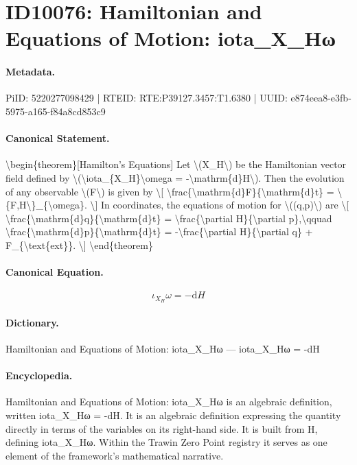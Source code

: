 \section*{ID10076: Hamiltonian and Equations of Motion: iota\_X\_Hω}
\paragraph{Metadata.}
PiID: 5220277098429 | RTEID: RTE:P39127.3457:T1.6380 | UUID: e874eea8-e3fb-5975-a165-f84a8cd853c9

\paragraph{Canonical Statement.}
\textbackslash{}begin\{theorem\}[Hamilton’s Equations] Let \textbackslash{}(X\_H\textbackslash{}) be the Hamiltonian vector field defined by \textbackslash{}(\textbackslash{}iota\_\{X\_H\}\textbackslash{}omega = -\textbackslash{}mathrm\{d\}H\textbackslash{}). Then the evolution of any observable \textbackslash{}(F\textbackslash{}) is given by \textbackslash{}[ \textbackslash{}frac\{\textbackslash{}mathrm\{d\}F\}\{\textbackslash{}mathrm\{d\}t\} = \textbackslash{}\{F,H\textbackslash{}\}\_\{\textbackslash{}omega\}. \textbackslash{}] In coordinates, the equations of motion for \textbackslash{}((q,p)\textbackslash{}) are \textbackslash{}[ \textbackslash{}frac\{\textbackslash{}mathrm\{d\}q\}\{\textbackslash{}mathrm\{d\}t\} = \textbackslash{}frac\{\textbackslash{}partial H\}\{\textbackslash{}partial p\},\textbackslash{}qquad \textbackslash{}frac\{\textbackslash{}mathrm\{d\}p\}\{\textbackslash{}mathrm\{d\}t\} = -\textbackslash{}frac\{\textbackslash{}partial H\}\{\textbackslash{}partial q\} + F\_\{\textbackslash{}text\{ext\}\}. \textbackslash{}] \textbackslash{}end\{theorem\}

\paragraph{Canonical Equation.}
\[
\iota_{X_H}\omega = -\mathrm{d}H
\]

\paragraph{Dictionary.}
Hamiltonian and Equations of Motion: iota\_X\_Hω — iota\_X\_Hω = -dH

\paragraph{Encyclopedia.}
Hamiltonian and Equations of Motion: iota\_X\_Hω is an algebraic definition, written iota\_X\_Hω = -dH. It is an algebraic definition expressing the quantity directly in terms of the variables on its right-hand side. It is built from H, defining iota\_X\_Hω. Within the Trawin Zero Point registry it serves as one element of the framework's mathematical narrative.
